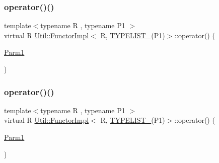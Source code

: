 \subsubsection{\texorpdfstring{operator()()}{operator()()}\hspace{0.1cm}{\footnotesize\ttfamily [1/3]}}
{\footnotesize\ttfamily template$<$typename R , typename P1 $>$ \\
virtual R \mbox{\hyperlink{classUtil_1_1FunctorImpl}{Util\+::\+Functor\+Impl}}$<$ R, \mbox{\hyperlink{adat__devel__install_2include_2adat_2typelist_8h_a6a7a6aa3dece450c8d239713e2952df7}{T\+Y\+P\+E\+L\+I\+S\+T\+\_}}(P1)$>$\+::operator() (\begin{DoxyParamCaption}\item[{\mbox{\hyperlink{structUtil_1_1Private_1_1FunctorImplBase_a9d61e693d6c616dea5bd9d9073c7d21a}{Parm1}}}]{ }\end{DoxyParamCaption})\hspace{0.3cm}{\ttfamily [pure virtual]}}

\mbox{\label{classUtil_1_1FunctorImpl_3_01R_00_01TYPELIST__1_07P1_08_4_a62c984afa0dca11e0101cfcba2052a8c}} 
\subsubsection{\texorpdfstring{operator()()}{operator()()}\hspace{0.1cm}{\footnotesize\ttfamily [2/3]}}
{\footnotesize\ttfamily template$<$typename R , typename P1 $>$ \\
virtual R \mbox{\hyperlink{classUtil_1_1FunctorImpl}{Util\+::\+Functor\+Impl}}$<$ R, \mbox{\hyperlink{adat__devel__install_2include_2adat_2typelist_8h_a6a7a6aa3dece450c8d239713e2952df7}{T\+Y\+P\+E\+L\+I\+S\+T\+\_}}(P1)$>$\+::operator() (\begin{DoxyParamCaption}\item[{\mbox{\hyperlink{structUtil_1_1Private_1_1FunctorImplBase_a9d61e693d6c616dea5bd9d9073c7d21a}{Parm1}}}]{ }\end{DoxyParamCaption})\hspace{0.3cm}{\ttfamily [pure virtual]}}

\mbox{\label{classUtil_1_1FunctorImpl_3_01R_00_01TYPELIST__1_07P1_08_4_a62c984afa0dca11e0101cfcba2052a8c}} 
